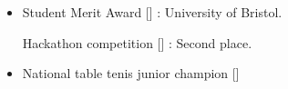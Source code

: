%
\begin{itemize}
    \setlength\itemsep{2em} %
    \iftrue
    \item {}
    \begin{itemize}%
        \iftrue
        {Student Merit Award}
        []
        : University of Bristol.
        \fi
        \iftrue
        {Hackathon competition}
        []
        : Second place.
        \fi
%
    \end{itemize}%
    \fi
\end{itemize}%
%
\begin{itemize}
    \setlength\itemsep{2em} %
    \iftrue
    \item {}
    \begin{itemize}%
        \iftrue
        {National table tenis junior champion}
        []
        
        \fi
%
    \end{itemize}%
    \fi
\end{itemize}